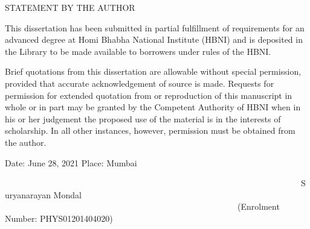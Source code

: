 \newpage

\begin{center}
  \vspace*{5em}
  \large
  \uppercase{Statement by the Author}
\end{center}

\normalsize

{\rm This dissertation has been submitted in partial fulfillment of requirements for an advanced degree at Homi Bhabha National Institute (HBNI) and is deposited in the Library to be made available to borrowers under rules of the HBNI.}

\vskip 5pt
{\rm Brief quotations from this dissertation are allowable without special permission, provided that accurate acknowledgement of source is made. Requests for permission for extended quotation from or reproduction of this manuscript in whole or in part may be granted by the Competent Authority of HBNI when in his or her judgement the proposed use of the material is in the interests of scholarship. In all other instances, however, permission must be obtained from the author.}

\vskip 30pt
{\rm Date: June 28, 2021}
\vskip 5pt
{\rm Place: Mumbai}
\vskip 30pt


\hspace{6cm}

~~~~~~~~~~~~~~~~~~~~~~~~~~~~~~~~~~~~~~~~~~~~~~~~~~~~~~~~~~~~~~~~~~~~~~{\rm Suryanarayan Mondal}
\vskip 5pt
~~~~~~~~~~~~~~~~~~~~~~~~~~~~~~~~~~~~~~~~~~~~~~~~~~~~~~~{\rm (Enrolment Number: PHYS01201404020)}


